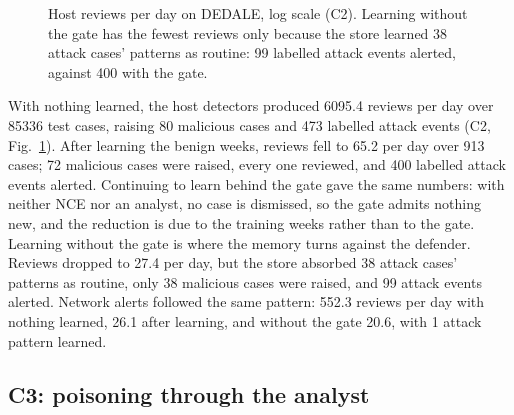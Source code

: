 \documentclass[conference]{IEEEtran}
\begin{document}
\begin{figure}[t]
\centering
{}
\caption{Host reviews per day on DEDALE, log scale (C2). Learning without the gate has the fewest reviews only
because the store learned 38 attack cases' patterns as routine: 99 labelled attack events alerted, against 400 with
the gate.}
\label{fig:c2}
\end{figure}

With nothing learned, the host detectors produced 6095.4 reviews per day over 85336 test cases, raising 80
malicious cases and 473 labelled attack events (C2, Fig.~\ref{fig:c2}). After learning the benign weeks, reviews fell to 65.2 per day
over 913 cases; 72 malicious cases were raised, every one reviewed, and 400 labelled attack events alerted.
Continuing to learn behind the gate gave the same numbers: with neither NCE nor an analyst, no case is dismissed,
so the gate admits nothing new, and the reduction is due to the training weeks rather than to the gate. Learning
without the gate is where the memory turns against the defender. Reviews dropped to 27.4 per day, but the store
absorbed 38 attack cases' patterns as routine, only 38 malicious cases were raised, and 99 attack events alerted.
Network alerts followed the same pattern: 552.3 reviews per day with nothing learned, 26.1 after learning, and
without the gate 20.6, with 1 attack pattern learned.

\subsection{C3: poisoning through the analyst}
\end{document}
